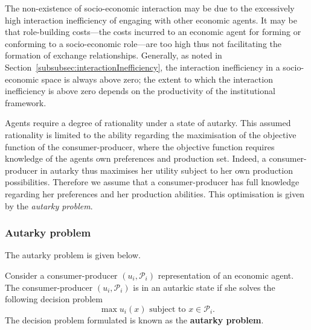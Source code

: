 \begin{subappendices}
The non-existence of socio-economic interaction may be due to the excessively high interaction inefficiency of engaging with other economic agents. It may be that role-building costs---the costs incurred to an economic agent for forming or conforming to a socio-economic role---are too high thus not facilitating the formation of exchange relationships. Generally, as noted in Section~\ref{subsubsec:interactionInefficiency}, the interaction inefficiency in a socio-economic space is always above zero; the extent to which the interaction inefficiency is above zero depends on the productivity of the institutional framework.

Agents require a degree of rationality under a state of autarky. This assumed rationality is limited to the ability regarding the maximisation of the objective function of the consumer-producer, where the objective function requires knowledge of the agents own preferences and production set. Indeed, a consumer-producer in autarky thus maximises her utility subject to her own production possibilities. Therefore we assume that a consumer-producer has full knowledge regarding her preferences and her production abilities. This optimisation is given by the \emph{autarky problem}.

\subsubsection{Autarky problem}

The autarky problem is given below.
\begin{definition} \label{def:autarkyproblem}
Consider a consumer-producer $(u_{i}, \mathcal{P}_i)$ representation of an economic agent. The consumer-producer $(u_{i}, \mathcal{P}_i)$ is in an autarkic state if she solves the following decision problem
\begin{equation}
\max u_{i}(x) \mbox{ subject to } x \in \mathcal{P}_{i} .
\end{equation}
The decision problem formulated is known as the \textbf{autarky problem}.


\end{definition}
\end{subappendices}
